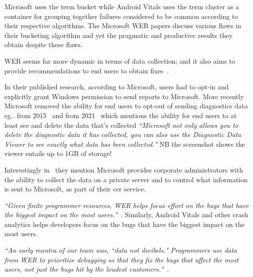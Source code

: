 Microsoft uses the term bucket while Android Vitals uses the term cluster as a container for grouping together failures considered to be common according to their respective algorithms. The Microsoft WER papers discuss various flaws in their bucketing algorithm and yet the pragmatic and productive results they obtain despite these flaws.



WER seems far more dynamic in terms of data collection; and it also aims to provide recommendations to end users to obtain fixes~.


In their published research, according to Microsoft, users had to opt-in and explicitly grant Windows permission to send reports to Microsoft. More recently Microsoft removed the ability for end users to opt-out of sending diagnostics data eg.. from 2015~ and from 2021~ which mentions the ability for end users to at least see and delete the data that's collected \emph{``Microsoft not only allows you to delete the diagnostic data it has collected, you can also use the Diagnostic Data Viewer to see exactly what data has been collected."} NB the screenshot shows the viewer entails up to 1GB of storage!

Interestingly in~ they mention Microsoft provides corporate administrators with the ability to collect the data on a private server and to control what information is sent to Microsoft, as part of their \acrfull{cer} service.



\emph{``Given finite programmer resources, WER helps focus effort on the bugs that have the biggest impact on the most users."}~. Similarly, Android Vitals and other crash analytics helps developers focus on the bugs that have the biggest impact on the most users.


\emph{``An early mantra of our team was, ``data not decibels." Programmers use data from WER to prioritize debugging so that they fix the bugs that affect the most users, not just the bugs hit by
the loudest customers."}~. 

